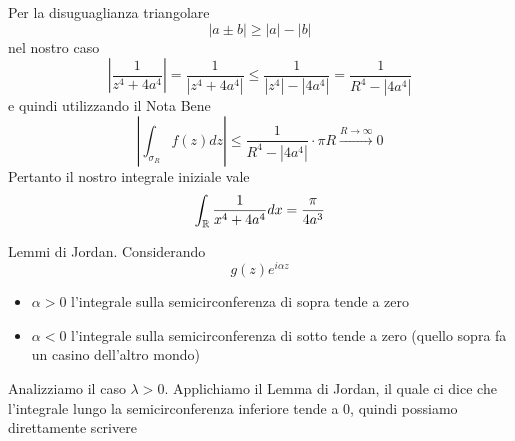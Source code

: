 Per la disuguaglianza triangolare
\begin{equation*}
\left| a\pm b\right| \geqslant \left| a\right| - \left| b\right| 
\end{equation*}
nel nostro caso
\begin{equation*}
\left| \frac{1}{z^{4} + 4a^{4}}\right| = \frac{1}{\left| z^{4} + 4a^{4}\right| } \leqslant \frac{1}{\left| z^{4}\right| - \left| 4a^{4}\right| } = \frac{1}{R^{4} - \left| 4a^{4}\right| }
\end{equation*}
e quindi utilizzando il Nota Bene
\begin{equation*}
\left| \int _{\sigma _{R}} f\left(z\right) dz\right| \leqslant \frac{1}{R^{4} - \left| 4a^{4}\right| } \cdot \pi R\xrightarrow{R\rightarrow \infty } 0
\end{equation*}
Pertanto il nostro integrale iniziale vale
\begin{equation*}
\int _{\mathbb{R} }\frac{1}{x^{4} + 4a^{4}} dx = \frac{\pi }{4a^{3}}
\end{equation*}
\Soluzione
\begin{thm}
Lemmi di Jordan. Considerando
\begin{equation*}
g\left(z\right) e^{i\alpha z}
\end{equation*}
\begin{itemize}
\item $\alpha  > 0$ l'integrale sulla semicirconferenza di sopra tende a zero
\item $\alpha < 0$ l'integrale sulla semicirconferenza di sotto tende a zero (quello sopra fa un casino dell'altro mondo)
\end{itemize}
\end{thm}
Analizziamo il caso $\lambda  > 0$. Applichiamo il Lemma di Jordan, il quale ci dice che l'integrale lungo la semicirconferenza inferiore tende a $0$, quindi possiamo direttamente scrivere


